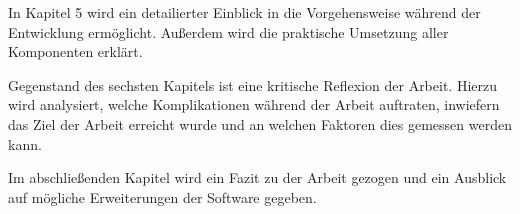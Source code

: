 In Kapitel 5 wird ein detailierter Einblick in die Vorgehensweise während der Entwicklung ermöglicht. Außerdem wird die praktische Umsetzung aller Komponenten erklärt.

\vspace{6mm}

\vspace{-2mm}

Gegenstand des sechsten Kapitels ist eine kritische Reflexion der Arbeit. Hierzu wird analysiert, welche Komplikationen während der Arbeit auftraten,
inwiefern das Ziel der Arbeit erreicht wurde und an welchen Faktoren dies gemessen werden kann.

\vspace{6mm}

\vspace{-2mm}

Im abschließenden Kapitel wird ein Fazit zu der Arbeit gezogen und ein Ausblick auf mögliche Erweiterungen der Software gegeben.
